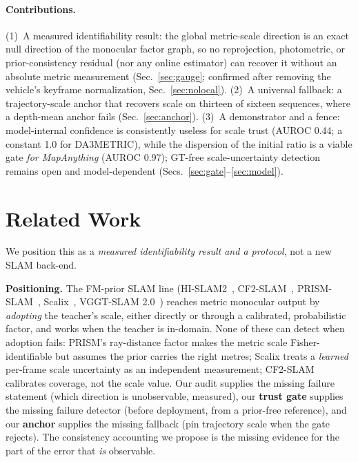 \paragraph{Contributions.} (1)~A measured identifiability result: the global
metric-scale direction is an exact null direction of the monocular factor graph,
so no reprojection, photometric, or prior-consistency residual (nor any online
estimator) can recover it without an absolute metric measurement
(Sec.~\ref{sec:gauge}; confirmed after removing the vehicle's keyframe normalization, Sec.~\ref{sec:nolocal}).
(2)~A universal fallback: a trajectory-scale anchor that recovers scale on
thirteen of sixteen sequences, where a depth-mean anchor fails (Sec.~\ref{sec:anchor}).
(3)~A demonstrator and a fence: model-internal confidence is consistently useless
for scale trust (AUROC 0.44; a constant 1.0 for DA3METRIC), while the dispersion
of the initial ratio is a viable gate \emph{for MapAnything} (AUROC 0.97);
GT-free scale-uncertainty detection remains open and model-dependent
(Secs.~\ref{sec:gate}--\ref{sec:model}).

\section{Related Work}

We position this as a \emph{measured identifiability result and a protocol}, not
a new SLAM back-end.

\noindent\textbf{Positioning.} The FM-prior SLAM line
(HI-SLAM2~\cite{hislam2}, CF2-SLAM~\cite{cf2slam}, PRISM-SLAM~\cite{prismslam},
Scalix~\cite{scalix}, VGGT-SLAM 2.0~\cite{vggtslam2}) reaches metric monocular
output by \emph{adopting} the teacher's scale, either directly or through a
calibrated, probabilistic factor, and works when the teacher is in-domain. None
of these can detect when adoption fails: PRISM's ray-distance factor makes the
metric scale Fisher-identifiable but assumes the prior carries the right metres;
Scalix treats a \emph{learned} per-frame scale uncertainty as an independent
measurement; CF2-SLAM calibrates coverage, not the scale value. Our audit
supplies the missing failure statement (which direction is unobservable,
measured), our \textbf{trust gate} supplies the missing failure detector (before
deployment, from a prior-free reference), and our \textbf{anchor} supplies the
missing fallback (pin trajectory scale when the gate rejects). The consistency
accounting we propose is the missing evidence for the part of the error that
\emph{is} observable.

